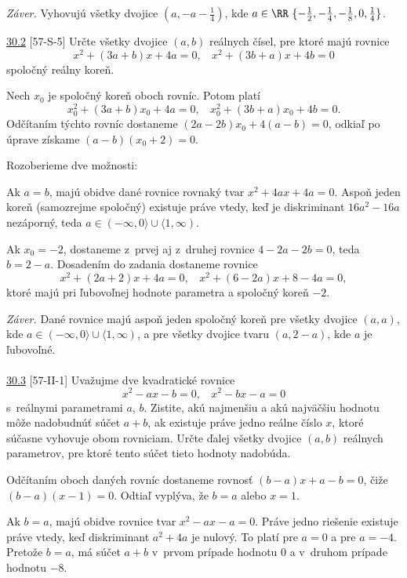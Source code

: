 \textit{Záver.} Vyhovujú všetky dvojice $(a, -a - \frac{1}{4})$, kde $a \in \RR \ \{-\frac{1}{2}, -\frac{1}{4}, -\frac{1}{8}, 0, \frac{1}{4}\}$.\\


\begin{tcolorbox}[breakable,notitle,boxrule=0pt,colback=light-gray,colframe=light-gray]\ul{30.2} [57-S-5]
Určte všetky dvojice $(a, b)$ reálnych čísel, pre ktoré majú rovnice
$$x^2 + (3a + b)x + 4a = 0, \ \ \ \  x^2 + (3b + a)x + 4b = 0$$
spoločný reálny koreň.

\end{tcolorbox}

\rieh Nech $x_0$ je spoločný koreň oboch rovníc. Potom platí
$$x_0^2+ (3a + b)x_0 + 4a = 0, \ \ \ \  x_0^2+ (3b + a)x_0 + 4b = 0.$$
Odčítaním týchto rovníc dostaneme $(2a-2b)x_0 +4(a-b) = 0$, odkiaľ po úprave získame $(a - b)(x_0 + 2) = 0$.

Rozoberieme dve možnosti:

Ak $a = b$, majú obidve dané rovnice rovnaký tvar $x^2 + 4ax + 4a = 0$. Aspoň jeden koreň (samozrejme spoločný) existuje práve vtedy, keď je diskriminant $16a^2-16a$ nezáporný, teda $a \in (-\infty, 0\rangle \cup \langle 1, \infty)$.

Ak $x_0 = -2$, dostaneme z~prvej aj z~druhej rovnice $4-2a-2b = 0$, teda $b = 2-a$. Dosadením do zadania dostaneme rovnice
$$x^2 + (2a + 2)x + 4a = 0, \ \ \ \ x^2 + (6-2a)x + 8-4a = 0,$$
ktoré majú pri ľubovoľnej hodnote parametra a spoločný koreň $-2$.

\textit{Záver.} Dané rovnice majú aspoň jeden spoločný koreň pre všetky dvojice $(a, a)$, kde $a \in (-\infty, 0\rangle \cup \langle 1, \infty)$, a pre všetky dvojice tvaru $(a, 2-a)$, kde $a$ je ľubovoľné.\\
\\
\ul{30.3} [57-II-1]  Uvažujme dve kvadratické rovnice
$$x^2-ax-b = 0,\ \ \ \  x^2-bx-a = 0$$
s~reálnymi parametrami $a$, $b$. Zistite, akú najmenšiu a akú najväčšiu hodnotu môže nadobudnúť súčet $a + b$, ak existuje práve jedno reálne číslo $x$, ktoré súčasne vyhovuje obom rovniciam. Určte ďalej všetky dvojice $(a, b)$ reálnych parametrov, pre ktoré tento súčet tieto hodnoty nadobúda.

\rieh Odčítaním oboch daných rovníc dostaneme rovnosť $(b-a)x+a-b = 0$, čiže $(b-a)(x-1) = 0$. Odtiaľ vyplýva, že $b = a$ alebo $x = 1$.

Ak $b = a$, majú obidve rovnice tvar $x^2-ax-a = 0$. Práve jedno riešenie existuje práve vtedy, keď diskriminant $a^2 + 4a$ je nulový. To platí pre $a = 0$ a pre $a = -4$. Pretože $b = a$, má súčet $a + b$ v~prvom prípade hodnotu $0$ a v~druhom prípade hodnotu $-8$.


